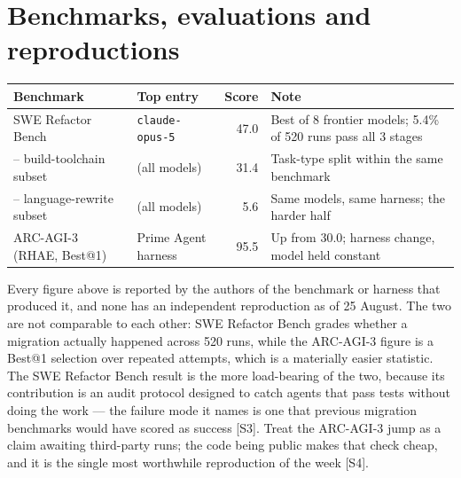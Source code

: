 \documentclass[11pt,a4paper]{article}
\newcommand{\srcref}[1]{\textcolor{brandaccent}{[S#1]}}
\begin{document}
\section{Benchmarks, evaluations and reproductions}

\begin{tabularx}{\textwidth}{@{}l l r X@{}}
\toprule
\textbf{Benchmark} & \textbf{Top entry} & \textbf{Score} & \textbf{Note} \\
\midrule
SWE Refactor Bench      & \texttt{claude-opus-5} & 47.0 & Best of 8 frontier models; 5.4\% of 520 runs pass all 3 stages \\
-- build-toolchain subset & (all models)         & 31.4 & Task-type split within the same benchmark \\
-- language-rewrite subset & (all models)        & 5.6  & Same models, same harness; the harder half \\
ARC-AGI-3 (RHAE, Best@1) & Prime Agent harness   & 95.5 & Up from 30.0; harness change, model held constant \\
\bottomrule
\end{tabularx}
\vspace{0.4em}

Every figure above is reported by the authors of the benchmark or harness that
produced it, and none has an independent reproduction as of 25 August. The two
are not comparable to each other: SWE Refactor Bench grades whether a migration
actually happened across 520 runs, while the ARC-AGI-3 figure is a Best@1
selection over repeated attempts, which is a materially easier statistic. The
SWE Refactor Bench result is the more load-bearing of the two, because its
contribution is an audit protocol designed to catch agents that pass tests
without doing the work --- the failure mode it names is one that previous
migration benchmarks would have scored as success \srcref{3}. Treat the
ARC-AGI-3 jump as a claim awaiting third-party runs; the code being public makes
that check cheap, and it is the single most worthwhile reproduction of the week
\srcref{4}.

\end{document}
